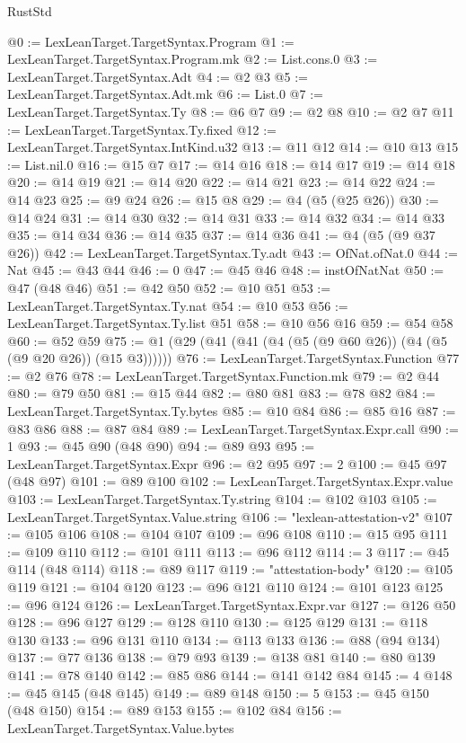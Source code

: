 \begin{lexlean}{RustStd}
\begin{coremodule}
{\begin{coremodule}
{{{{{{{{{{{{{{{{{{{{{{{{{{{{{{{{{{{{{{{{{{{{{{{{{{{{{{{{{{{{@0 := LexLeanTarget.TargetSyntax.Program
@1 := LexLeanTarget.TargetSyntax.Program.mk
@2 := List.cons.{0}
@3 := LexLeanTarget.TargetSyntax.Adt
@4 := @2 @3
@5 := LexLeanTarget.TargetSyntax.Adt.mk
@6 := List.{0}
@7 := LexLeanTarget.TargetSyntax.Ty
@8 := @6 @7
@9 := @2 @8
@10 := @2 @7
@11 := LexLeanTarget.TargetSyntax.Ty.fixed
@12 := LexLeanTarget.TargetSyntax.IntKind.u32
@13 := @11 @12
@14 := @10 @13
@15 := List.nil.{0}
@16 := @15 @7
@17 := @14 @16
@18 := @14 @17
@19 := @14 @18
@20 := @14 @19
@21 := @14 @20
@22 := @14 @21
@23 := @14 @22
@24 := @14 @23
@25 := @9 @24
@26 := @15 @8
@29 := @4 (@5 (@25 @26))
@30 := @14 @24
@31 := @14 @30
@32 := @14 @31
@33 := @14 @32
@34 := @14 @33
@35 := @14 @34
@36 := @14 @35
@37 := @14 @36
@41 := @4 (@5 (@9 @37 @26))
@42 := LexLeanTarget.TargetSyntax.Ty.adt
@43 := OfNat.ofNat.{0}
@44 := Nat
@45 := @43 @44
@46 := 0
@47 := @45 @46
@48 := instOfNatNat
@50 := @47 (@48 @46)
@51 := @42 @50
@52 := @10 @51
@53 := LexLeanTarget.TargetSyntax.Ty.nat
@54 := @10 @53
@56 := LexLeanTarget.TargetSyntax.Ty.list @51
@58 := @10 @56 @16
@59 := @54 @58
@60 := @52 @59
@75 := @1 (@29 (@41 (@41 (@4 (@5 (@9 @60 @26)) (@4 (@5 (@9 @20 @26)) (@15 @3))))))
@76 := LexLeanTarget.TargetSyntax.Function
@77 := @2 @76
@78 := LexLeanTarget.TargetSyntax.Function.mk
@79 := @2 @44
@80 := @79 @50
@81 := @15 @44
@82 := @80 @81
@83 := @78 @82
@84 := LexLeanTarget.TargetSyntax.Ty.bytes
@85 := @10 @84
@86 := @85 @16
@87 := @83 @86
@88 := @87 @84
@89 := LexLeanTarget.TargetSyntax.Expr.call
@90 := 1
@93 := @45 @90 (@48 @90)
@94 := @89 @93
@95 := LexLeanTarget.TargetSyntax.Expr
@96 := @2 @95
@97 := 2
@100 := @45 @97 (@48 @97)
@101 := @89 @100
@102 := LexLeanTarget.TargetSyntax.Expr.value
@103 := LexLeanTarget.TargetSyntax.Ty.string
@104 := @102 @103
@105 := LexLeanTarget.TargetSyntax.Value.string
@106 := "lexlean-attestation-v2"
@107 := @105 @106
@108 := @104 @107
@109 := @96 @108
@110 := @15 @95
@111 := @109 @110
@112 := @101 @111
@113 := @96 @112
@114 := 3
@117 := @45 @114 (@48 @114)
@118 := @89 @117
@119 := "attestation-body"
@120 := @105 @119
@121 := @104 @120
@123 := @96 @121 @110
@124 := @101 @123
@125 := @96 @124
@126 := LexLeanTarget.TargetSyntax.Expr.var
@127 := @126 @50
@128 := @96 @127
@129 := @128 @110
@130 := @125 @129
@131 := @118 @130
@133 := @96 @131 @110
@134 := @113 @133
@136 := @88 (@94 @134)
@137 := @77 @136
@138 := @79 @93
@139 := @138 @81
@140 := @80 @139
@141 := @78 @140
@142 := @85 @86
@144 := @141 @142 @84
@145 := 4
@148 := @45 @145 (@48 @145)
@149 := @89 @148
@150 := 5
@153 := @45 @150 (@48 @150)
@154 := @89 @153
@155 := @102 @84
@156 := LexLeanTarget.TargetSyntax.Value.bytes
}}}}}}}}}}}}}}}}}}}}}}}}}}}}}}}}}}}}}}}}}}}}}}}}}}}}}}}}}}}}
\end{coremodule}}
\end{coremodule}
\end{lexlean}
